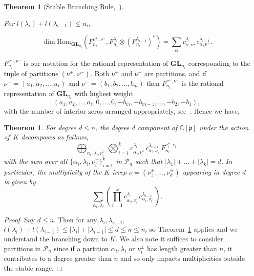 \documentclass[11pt]{article}
\newtheorem{thm}[theo]{Theorem}
\theoremstyle{definition}
\numberwithin{equation}{section}
\newcommand{\C}{\mathbb{C}}
\newcommand{\p}{\mathfrak{p}}
\newcommand{\GL}{\textbf{GL}}
\newcommand{\Par}{\mathcal{P}}
\newcommand{\Hom}{\text{Hom}}
\begin{document}
\begin{thm} [{Stable Branching Rule,~\cite[Theorem 2.1.4.1]{HoweTanWillenbring2008}}] \label{thm-stablebranching}

For $l(\lambda_i) + l(\lambda_{i-1}) \leq n_i$,

$$\dim \Hom_{\GL_{n_i}}(F^{\nu^+, \nu^-}_{n_i}, F^{\lambda_i}_{n_i} \otimes (F^{\lambda_{i-1}}_{n_i})^*) = \sum_\alpha c^{\lambda_i}_{\alpha, \nu^+} c^{\lambda_{i-1}}_{\alpha, \nu^-}.$$


\end{thm}

$F_{n_i}^{\nu^+, \nu^-}$ is our notation for the rational representation of $\GL_{n_i}$ corresponding to the tuple of partitions $(\nu^+, \nu^-)$. Both $\nu^+$ and $\nu^-$ are partitions, and if $\nu^+ = (a_1,a_2,\dots,a_\ell)$ and $\nu^- = (b_1, b_2, \dots, b_m)$ then $F_{n_i}^{\nu^+, \nu^-}$ is the rational representation of $\GL_{n_i}$ with highest weight $$(a_1,a_2,\dots,a_\ell,0,\dots,0,-b_m,-b_{m-1},\dots,-b_2,-b_1),$$ with the number of interior zeros arranged appropriately, see~\cite{STEMBRIDGE198779}. Hence we have,

\begin{thm}
    For degree $d \leq n$, the degree $d$ component of $\C[\p]$ under the action of~$K$ decomposes as follows,
    $$\bigoplus_{\alpha_i, \lambda_i, \nu_i^\pm}\bigotimes_{i=1}^k
    c^{\lambda_i}_{\alpha_i, \nu_i^+} c^{\lambda_{i-1}}_{\alpha_i, \nu_i^-} 
    F^{\nu_i^+, \nu_i^-}_{n_i}$$
    with the sum over all $\{\alpha_i, \lambda_i, \nu_i^\pm\}_{i=1}^k$ in $\Par_n$ such that $|\lambda_1| + \dots + |\lambda_k| = d$. In particular, the multiplicity of the $K$ irrep $\nu = (\nu_1^\pm, \dots , \nu_k^\pm)$ appearing in degree $d$ is given by
    $$\sum_{\alpha_i, \lambda_i} (\prod_{i=1}^k
    c^{\lambda_i}_{\alpha_i, \nu_i^+} c^{\lambda_{i-1}}_{\alpha_i, \nu_i^-}).$$
    
\end{thm}

\begin{proof}
    Say $d \leq n$. Then for any $\lambda_i, \lambda_{i-1}$, $l(\lambda_i) + l(\lambda_{i-1}) \leq |\lambda_i| + |\lambda_{i-1}| \leq d \leq n \leq n_i$ so Theorem~\ref{thm-stablebranching} applies and we understand the branching down to $K$. We also note it suffices to consider partitions in $\Par_n$ since if a partition $\alpha_i, \lambda_i$ or $\nu_i^\pm$ has length greater than $n$, it contributes to a degree greater than $n$ and so only impacts multiplicities outside the stable range.
\end{proof}
\end{document}
